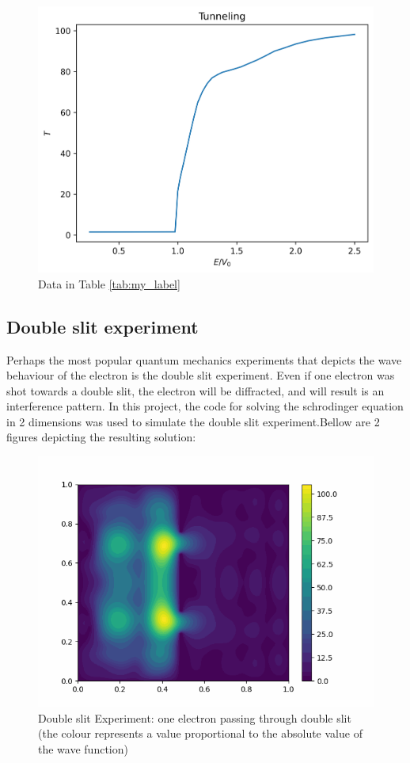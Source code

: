 \documentclass[10pt, a4paper]{article}
\begin{document}
\begin{adjustwidth}{1cm}{}
\begin{figure}[H]
    \centering
    \includegraphics{tunneling.png}
    \caption{Data in Table \ref{tab:my_label}}
    \label{fig:my_label}
\end{figure}
\subsection{Double slit experiment}
Perhaps the most popular quantum mechanics experiments that depicts the wave behaviour of the electron is the double slit experiment. Even if one electron was shot towards a double slit, the electron will be diffracted, and will result is an interference pattern. In this project, the code for solving the schrodinger equation in 2 dimensions was used to simulate the double slit experiment.Bellow are 2 figures depicting the resulting solution:
\begin{figure}[H]
    \centering
    \includegraphics[scale = 0.7]{2023-02-10 (2).png}
    \caption{Double slit Experiment: one electron passing through double slit (the colour represents a value proportional to the absolute value of the wave function)}
    \label{fig:Double_Slit}
\end{figure}


\end{adjustwidth}
\end{document}
